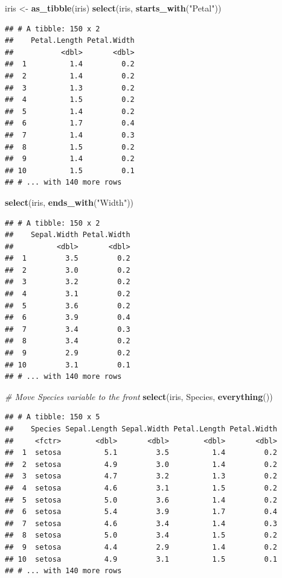 \documentclass[]{book}
\newenvironment{Shaded}{\begin{snugshade}}{\end{snugshade}}
\newcommand{\KeywordTok}[1]{\textcolor[rgb]{0.13,0.29,0.53}{\textbf{#1}}}
\newcommand{\StringTok}[1]{\textcolor[rgb]{0.31,0.60,0.02}{#1}}
\newcommand{\CommentTok}[1]{\textcolor[rgb]{0.56,0.35,0.01}{\textit{#1}}}
\newcommand{\NormalTok}[1]{#1}
\begin{document}
\begin{Shaded}
\begin{Highlighting}[]
\NormalTok{iris <-}\StringTok{ }\KeywordTok{as_tibble}\NormalTok{(iris)}
\KeywordTok{select}\NormalTok{(iris, }\KeywordTok{starts_with}\NormalTok{(}\StringTok{"Petal"}\NormalTok{))}
\end{Highlighting}
\end{Shaded}

\begin{verbatim}
## # A tibble: 150 x 2
##    Petal.Length Petal.Width
##           <dbl>       <dbl>
##  1          1.4         0.2
##  2          1.4         0.2
##  3          1.3         0.2
##  4          1.5         0.2
##  5          1.4         0.2
##  6          1.7         0.4
##  7          1.4         0.3
##  8          1.5         0.2
##  9          1.4         0.2
## 10          1.5         0.1
## # ... with 140 more rows
\end{verbatim}

\begin{Shaded}
\begin{Highlighting}[]
\KeywordTok{select}\NormalTok{(iris, }\KeywordTok{ends_with}\NormalTok{(}\StringTok{"Width"}\NormalTok{))}
\end{Highlighting}
\end{Shaded}

\begin{verbatim}
## # A tibble: 150 x 2
##    Sepal.Width Petal.Width
##          <dbl>       <dbl>
##  1         3.5         0.2
##  2         3.0         0.2
##  3         3.2         0.2
##  4         3.1         0.2
##  5         3.6         0.2
##  6         3.9         0.4
##  7         3.4         0.3
##  8         3.4         0.2
##  9         2.9         0.2
## 10         3.1         0.1
## # ... with 140 more rows
\end{verbatim}

\begin{Shaded}
\begin{Highlighting}[]
\CommentTok{# Move Species variable to the front}
\KeywordTok{select}\NormalTok{(iris, Species, }\KeywordTok{everything}\NormalTok{())}
\end{Highlighting}
\end{Shaded}

\begin{verbatim}
## # A tibble: 150 x 5
##    Species Sepal.Length Sepal.Width Petal.Length Petal.Width
##     <fctr>        <dbl>       <dbl>        <dbl>       <dbl>
##  1  setosa          5.1         3.5          1.4         0.2
##  2  setosa          4.9         3.0          1.4         0.2
##  3  setosa          4.7         3.2          1.3         0.2
##  4  setosa          4.6         3.1          1.5         0.2
##  5  setosa          5.0         3.6          1.4         0.2
##  6  setosa          5.4         3.9          1.7         0.4
##  7  setosa          4.6         3.4          1.4         0.3
##  8  setosa          5.0         3.4          1.5         0.2
##  9  setosa          4.4         2.9          1.4         0.2
## 10  setosa          4.9         3.1          1.5         0.1
## # ... with 140 more rows
\end{verbatim}
\end{document}
